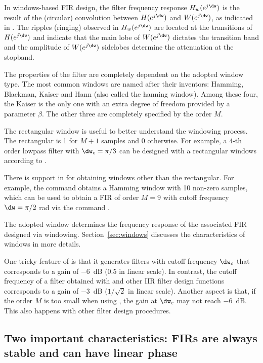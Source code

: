 In windows-based FIR design, the filter frequency response $H_w(e^{j\dw})$ is the
 result of the (circular) convolution
between $H(e^{j\dw})$ and $W(e^{j\dw})$, as indicated in . The ripples
(ringing) 
observed in $H_w(e^{j\dw})$ are located at the transitions of $H(e^{j\dw})$ and
indicate that the main lobe of $W(e^{j\dw})$ dictates the transition band and
the amplitude of $W(e^{j\dw})$ sidelobes determine the attenuation at the stopband.


The properties of the filter are completely dependent on the adopted window type. The most common windows are named after their inventors: Hamming, Blackman, Kaiser and Hann (also called the hanning window). Among these four, the Kaiser is the only one with an extra degree of freedom provided by a parameter $\beta$. The other three are completely specified by the order $M$. 

The rectangular window is useful to better understand the windowing process. The rectangular
is 1 for $M+1$ samples and 0 otherwise.
For example, a $4$-th order lowpass filter with $\dw_c = \pi/3$ can be designed with a rectangular windows according to .




There is support in {\matlab} for obtaining windows other than the rectangular. For example, the command  obtains a Hamming window with 10 non-zero samples, which can be used to obtain a FIR of order $M=9$ with cutoff frequency $\dw=\pi/2$ rad via the command .

The adopted window determines the frequency response of the associated FIR designed via windowing.
Section~\ref{sec:windows} discusses the characteristics of windows in more details. 

One tricky feature of  is that it generates filters with cutoff frequency $\dw_c$ that corresponds to a gain of $-6$~dB (0.5 in linear scale). In contrast, the cutoff frequency of a filter obtained with  and other IIR filter design functions corresponds to a gain of $-3$~dB ($1/\sqrt{2}$ in linear scale). Another aspect is that, if the order $M$ is too small when using , the gain at $\dw_c$ may not reach $-6$~dB. This also happens with other filter design procedures.

\subsection{Two important characteristics: FIRs are always stable and can have linear phase}


